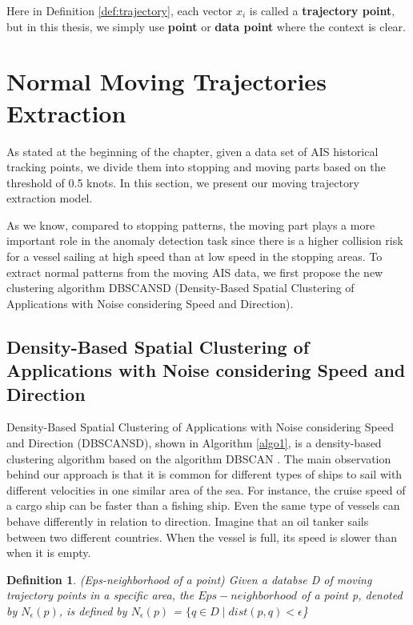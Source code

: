 \documentclass[12pt,glossary]{dalcsthesis}
\newtheorem{definition}{Definition}
\begin{document}
Here in Definition \ref{def:trajectory}, each vector $x_i$ is called a \textbf{trajectory point}, but in this thesis, we simply use \textbf{point} or \textbf{data point} where the context is clear.


\section{Normal Moving Trajectories Extraction}
\label{sec:normal_moving_model}


As stated at the beginning of the chapter, given a data set of AIS historical tracking points, we divide them into stopping and moving parts based on the threshold of 0.5 knots. In this section, we present our moving trajectory extraction model.

As we know, compared to stopping patterns, the moving part plays a more important role in the anomaly detection task since there is a higher collision risk for a vessel sailing at high speed than at low speed in the stopping areas. To extract normal patterns from the moving AIS data, we first propose the new clustering algorithm DBSCANSD (Density-Based Spatial Clustering of Applications with Noise considering Speed and Direction).

\subsection{Density-Based Spatial Clustering of Applications with Noise considering Speed and Direction}


Density-Based Spatial Clustering of Applications with Noise considering Speed and Direction (DBSCANSD), shown in Algorithm \ref{algo1}, is a density-based clustering algorithm based on the algorithm DBSCAN \cite{DBScan96}. The main observation behind our approach is that it is common for different types of ships to sail with different velocities in one similar area of the sea. For instance, the cruise speed of a cargo ship can be faster than a fishing ship. Even the same type of vessels can behave differently in relation to direction. Imagine that an oil tanker sails between two different countries. When the vessel is full, its speed is slower than when it is empty. 

\begin{definition}
\label{def:epsneighborhood_old}
(Eps-neighborhood of a point) Given a databse D of moving trajectory points in a specific area, the $Eps-neighborhood$ of a point p, denoted by $N_{\epsilon}(p)$, is defined by $N_{\epsilon}(p)$ = $\{ q\in D \mid dist(p, q) < \epsilon$\}
\end{definition}
\end{document}
